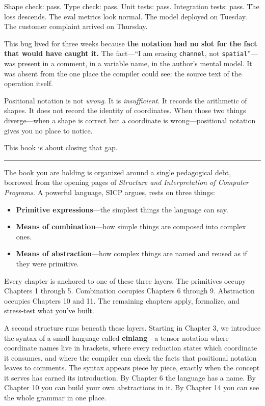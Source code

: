 \documentclass[11pt,]{article}
\providecommand{\tightlist}{%
  \setlength{\itemsep}{0pt}\setlength{\parskip}{0pt}}
\begin{document}
Shape check: pass. Type check: pass. Unit tests: pass. Integration
tests: pass. The loss descends. The eval metrics look normal. The model
deployed on Tuesday. The customer complaint arrived on Thursday.

This bug lived for three weeks because \textbf{the notation had no slot
for the fact that would have caught it.} The fact---``I am erasing
\texttt{channel}, not \texttt{spatial}''---was present in a comment, in
a variable name, in the author's mental model. It was absent from the
one place the compiler could see: the source text of the operation
itself.

Positional notation is not \emph{wrong}. It is \emph{insufficient}. It
records the arithmetic of shapes. It does not record the identity of
coordinates. When those two things diverge---when a shape is correct but
a coordinate is wrong---positional notation gives you no place to
notice.

This book is about closing that gap.

\begin{center}\rule{0.5\linewidth}{0.4pt}\end{center}

The book you are holding is organized around a single pedagogical debt,
borrowed from the opening pages of \emph{Structure and Interpretation of
Computer Programs}. A powerful language, SICP argues, rests on three
things:

\begin{itemize}
\tightlist
\item
  \textbf{Primitive expressions}---the simplest things the language can
  say.
\item
  \textbf{Means of combination}---how simple things are composed into
  complex ones.
\item
  \textbf{Means of abstraction}---how complex things are named and
  reused as if they were primitive.
\end{itemize}

Every chapter is anchored to one of these three layers. The primitives
occupy Chapters 1 through 5. Combination occupies Chapters 6 through 9.
Abstraction occupies Chapters 10 and 11. The remaining chapters apply,
formalize, and stress-test what you've built.

A second structure runs beneath these layers. Starting in Chapter 3, we
introduce the syntax of a small language called \textbf{einlang}---a
tensor notation where coordinate names live in brackets, where every
reduction states which coordinate it consumes, and where the compiler
can check the facts that positional notation leaves to comments. The
syntax appears piece by piece, exactly when the concept it serves has
earned its introduction. By Chapter 6 the language has a name. By
Chapter 10 you can build your own abstractions in it. By Chapter 14 you
can see the whole grammar in one place.
\end{document}
